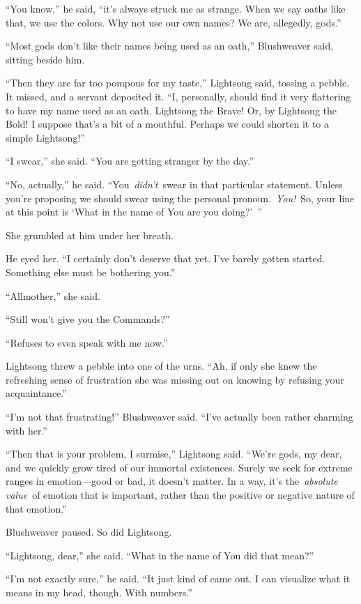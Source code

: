 “You know,” he said, “it’s always struck me as strange. When we say oaths like that, we use the colors. Why not use our own names? We are, allegedly, gods.”

“Most gods don’t like their names being used as an oath,” Blushweaver said, sitting beside him.

“Then they are far too pompous for my taste,” Lightsong said, tossing a pebble. It missed, and a servant deposited it. “I, personally, should find it very flattering to have my name used as an oath. Lightsong the Brave! Or, by Lightsong the Bold! I suppose that’s a bit of a mouthful. Perhaps we could shorten it to a simple Lightsong!”

“I swear,” she said. “You are getting stranger by the day.”

“No, actually,” he said. “You~\textit{didn’t}~swear in that particular statement. Unless you’re proposing we should swear using the personal pronoun.~\textit{You!}~So, your line at this point is ‘What in the name of You are you doing?’~”

She grumbled at him under her breath.

He eyed her. “I certainly don’t deserve that yet. I’ve barely gotten started. Something else must be bothering you.”

“Allmother,” she said.

“Still won’t give you the Commands?”

“Refuses to even speak with me now.”

Lightsong threw a pebble into one of the urns. “Ah, if only she knew the refreshing sense of frustration she was missing out on knowing by refusing your acquaintance.”

“I’m not that frustrating!” Blushweaver said. “I’ve actually been rather charming with her.”

“Then that is your problem, I surmise,” Lightsong said. “We’re gods, my dear, and we quickly grow tired of our immortal existences. Surely we seek for extreme ranges in emotion—good or bad, it doesn’t matter. In a way, it’s the~\textit{absolute value}~of emotion that is important, rather than the positive or negative nature of that emotion.”

Blushweaver paused. So did Lightsong.

“Lightsong, dear,” she said. “What in the name of You did that mean?”

“I’m not exactly sure,” he said. “It just kind of came out. I can visualize what it means in my head, though. With numbers.”

